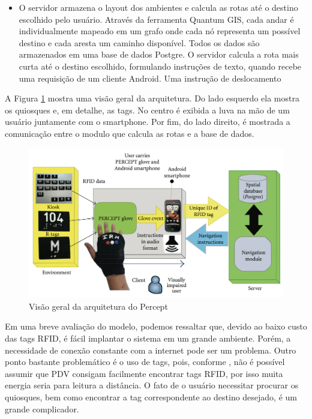 \documentclass[english,brazilian]{UNISINOSmonografia}
\begin{document}
\begin{itemize}
	\item O servidor armazena o layout dos ambientes e calcula as rotas até o destino escolhido pelo usuário. Através da ferramenta Quantum GIS, cada andar é individualmente mapeado em um grafo onde cada nó representa um possível destino e cada aresta um caminho disponível. Todos os dados são armazenados em uma base de dados Postgre. O servidor calcula a rota mais curta até o destino escolhido, formulando instruções de texto, quando recebe uma requisição de um cliente Android. Uma instrução de deslocamento 
\end{itemize}

A Figura \ref{fig:visaoGeralPercept} mostra uma visão geral da arquitetura. Do lado esquerdo ela mostra os quiosques e, em detalhe, as tags. No centro é exibida a luva na mão de um usuário juntamente com o smartphone. Por fim, do lado direito, é mostrada a comunicação entre o modulo que calcula as rotas e a base de dados.


\begin{figure}[!ht]
	\caption{Visão geral da arquitetura do Percept}
	\label{fig:visaoGeralPercept}
	\centering%
	\begin{minipage}{.9\textwidth}
		\includegraphics[width=\textwidth]{imgs/perceptArquitetura}
	\end{minipage}
\end{figure}


Em uma breve avaliação do modelo, podemos ressaltar que, devido ao baixo custo das tags RFID, é fácil implantar o sistema em um grande ambiente. Porém, a necessidade de conexão constante com a internet pode ser um problema. Outro ponto bastante problemático é o uso de tags, pois, conforme , não é possível assumir que PDV consigam facilmente encontrar tags RFID, por isso muita energia seria para leitura a distância. O fato de o usuário necessitar procurar os quiosques, bem como encontrar a tag correspondente ao destino desejado, é um grande complicador.
\end{document}
